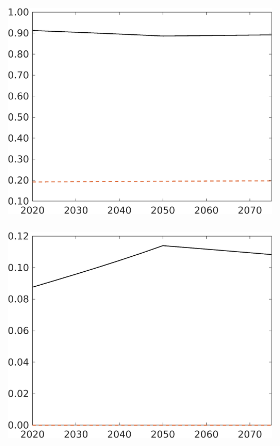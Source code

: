 \begin{figure}[h!!]
\begin{subfigure}{1\textwidth}
\begin{subfigure}[]{0.32\textwidth}
		\end{subfigure}	
		\begin{subfigure}[]{0.32\textwidth}
			\includegraphics[width=1\textwidth]{../../codding_model/own_basedOnFried/optimalPol_010922_revision/figures/all_13Sept22_Tplus30/sn_LFCompSP_T_regime4_knspil1_spillover0_noskill0_sep0_xgrowth0_PV1_etaa0.79_lgd0.png}
		\end{subfigure}	
		\begin{subfigure}[]{0.32\textwidth}
			\includegraphics[width=1\textwidth]{../../codding_model/own_basedOnFried/optimalPol_010922_revision/figures/all_13Sept22_Tplus30/sg_LFCompSP_T_regime4_knspil1_spillover0_noskill0_sep0_xgrowth0_PV1_etaa0.79_lgd0.png}
		\end{subfigure}	
	\end{subfigure}	
\end{figure}
\clearpage
